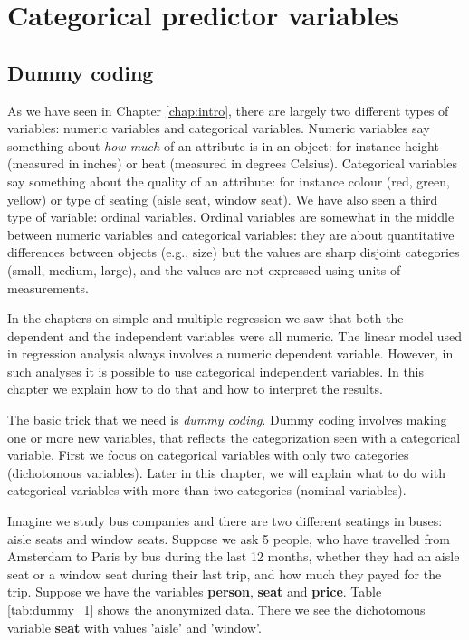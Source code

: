 \chapter{Categorical predictor variables}\label{chap:categorical}



\section{Dummy coding}
As we have seen in Chapter \ref{chap:intro}, there are largely two different types of variables: numeric variables and categorical variables. Numeric variables say something about \textit{how much} of an attribute is in an object: for instance height (measured in inches) or heat (measured in degrees Celsius). Categorical variables say something about the quality of an attribute: for instance colour (red, green, yellow) or type of seating (aisle seat, window seat). We have also seen a third type of variable: ordinal variables. Ordinal variables are somewhat in the middle between numeric variables and categorical variables: they are about quantitative differences between objects (e.g., size) but the values are sharp disjoint categories (small, medium, large), and the values are not expressed using units of measurements.

In the chapters on simple and multiple regression we saw that both the dependent and the independent variables were all numeric. The linear model used in regression analysis always involves a numeric dependent variable. However, in such analyses it is possible to use categorical independent variables. In this chapter we explain how to do that and how to interpret the results. 

The basic trick that we need is \textit{dummy coding}. Dummy coding involves making one or more new variables, that reflects the categorization seen with a categorical variable. First we focus on categorical variables with only two categories (dichotomous variables). Later in this chapter, we will explain what to do with categorical variables with more than two categories (nominal variables). 

Imagine we study bus companies and there are two different seatings in buses: aisle seats and window seats. Suppose we ask 5 people, who have travelled from Amsterdam to Paris by bus during the last 12 months, whether they had an aisle seat or a window seat during their last trip, and how much they payed for the trip. Suppose we have the variables \textbf{person}, \textbf{seat} and \textbf{price}. Table \ref{tab:dummy_1} shows the anonymized data. There we see the dichotomous variable \textbf{seat} with values 'aisle' and 'window'. 

